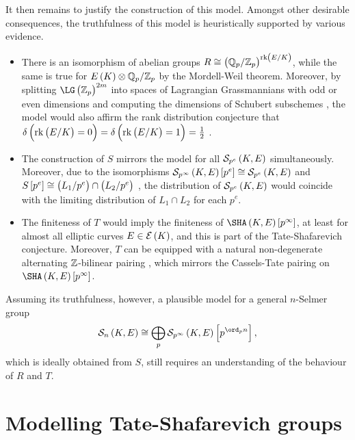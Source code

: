 It then remains to justify the construction of this model. Amongst other desirable consequences, the truthfulness of this model is heuristically supported by various evidence.
\begin{itemize}
\item There is an isomorphism of abelian groups $ R \cong \br{\QQ_p / \ZZ_p}^{\rkE} $, while the same is true for $ E\br{K} \otimes \QQ_p / \ZZ_p $ by the Mordell-Weil theorem. Moreover, by splitting $ \LG\br{\ZZ_p}^{2m} $ into spaces of Lagrangian Grassmannians with odd or even dimensions \cite[Proposition 4.5]{BKLPR15} and computing the dimensions of Schubert subschemes \cite[Proposition 4.9]{BKLPR15}, the model would also affirm the rank distribution conjecture that $ \delta\br{\rkE = 0} = \delta\br{\rkE = 1} = \tfrac{1}{2} $ \cite[Proposition 5.6]{BKLPR15}.
\item The construction of $ S $ mirrors the model for all $ \Sel[p^e] $ simultaneously. Moreover, due to the isomorphisms $ \Sel[p^\infty]\sbr{p^e} \cong \Sel[p^e] $ and $ S\sbr{p^e} \cong \br{L_1 / p^e} \cap \br{L_2 / p^e} $ \cite[Proposition 5.4]{BKLPR15}, the distribution of $ \Sel[p^e] $ would coincide with the limiting distribution of $ L_1 \cap L_2 $ for each $ p^e $.
\item The finiteness of $ T $ \cite[Corollary 5.2]{BKLPR15} would imply the finiteness of $ \Sha\sbr{p^\infty} $, at least for almost all elliptic curves $ E \in \EEE\br{K} $, and this is part of the Tate-Shafarevich conjecture. Moreover, $ T $ can be equipped with a natural non-degenerate alternating $ \mathbb{Z} $-bilinear pairing \cite[Proposition 5.5]{BKLPR15}, which mirrors the Cassels-Tate pairing on $ \Sha\sbr{p^\infty} $.
\end{itemize}
Assuming its truthfulness, however, a plausible model for a general $ n $-Selmer group
\begin{equation}
\label{eq:3}
\Sel[n] \cong \bigoplus_p \Sel[p^\infty]\sbr{p^{\ord_p n}},
\end{equation}
which is ideally obtained from $ S $, still requires an understanding of the behaviour of $ R $ and $ T $.

\section{Modelling Tate-Shafarevich groups}

